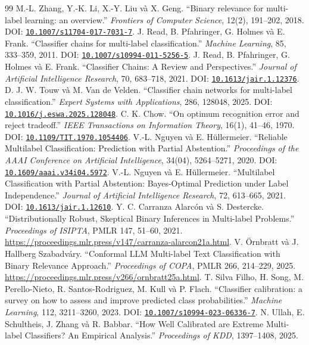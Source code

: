 \documentclass[11pt,a4paper]{article}
\newcommand{\doi}[1]{\href{https://doi.org/#1}{\nolinkurl{#1}}}
\begin{document}
\begin{thebibliography}{99}\small
{} M.-L. Zhang, Y.-K. Li, X.-Y. Liu và X. Geng.
“Binary relevance for multi-label learning: an overview.”
\emph{Frontiers of Computer Science}, 12(2), 191--202, 2018.
DOI: \doi{10.1007/s11704-017-7031-7}.
 J. Read, B. Pfahringer, G. Holmes và E. Frank.
“Classifier chains for multi-label classification.”
\emph{Machine Learning}, 85, 333--359, 2011.
DOI: \doi{10.1007/s10994-011-5256-5}.
 J. Read, B. Pfahringer, G. Holmes và E. Frank.
“Classifier Chains: A Review and Perspectives.”
\emph{Journal of Artificial Intelligence Research}, 70, 683--718, 2021.
DOI: \doi{10.1613/jair.1.12376}.
 D. J. W. Touw và M. Van de Velden.
“Classifier chain networks for multi-label classification.”
\emph{Expert Systems with Applications}, 286, 128048, 2025.
DOI: \doi{10.1016/j.eswa.2025.128048}.
 C. K. Chow.
“On optimum recognition error and reject tradeoff.”
\emph{IEEE Transactions on Information Theory}, 16(1), 41--46, 1970.
DOI: \doi{10.1109/TIT.1970.1054406}.
 V.-L. Nguyen và E. Hüllermeier.
“Reliable Multilabel Classification: Prediction with Partial Abstention.”
\emph{Proceedings of the AAAI Conference on Artificial Intelligence}, 34(04), 5264--5271, 2020.
DOI: \doi{10.1609/aaai.v34i04.5972}.
 V.-L. Nguyen và E. Hüllermeier.
“Multilabel Classification with Partial Abstention: Bayes-Optimal Prediction under Label Independence.”
\emph{Journal of Artificial Intelligence Research}, 72, 613--665, 2021.
DOI: \doi{10.1613/jair.1.12610}.
 Y. C. Carranza Alarcón và S. Destercke.
“Distributionally Robust, Skeptical Binary Inferences in Multi-label Problems.”
\emph{Proceedings of ISIPTA}, PMLR 147, 51--60, 2021.
\url{https://proceedings.mlr.press/v147/carranza-alarcon21a.html}.
 V. Örnbratt và J. Hallberg Szabadváry.
“Conformal LLM Multi-label Text Classification with Binary Relevance Approach.”
\emph{Proceedings of COPA}, PMLR 266, 214--229, 2025.
\url{https://proceedings.mlr.press/v266/ornbratt25a.html}.
 T. Silva Filho, H. Song, M. Perello-Nieto, R. Santos-Rodriguez, M. Kull và P. Flach.
“Classifier calibration: a survey on how to assess and improve predicted class probabilities.”
\emph{Machine Learning}, 112, 3211--3260, 2023.
DOI: \doi{10.1007/s10994-023-06336-7}.
 N. Ullah, E. Schultheis, J. Zhang và R. Babbar.
“How Well Calibrated are Extreme Multi-label Classifiers? An Empirical Analysis.”
\emph{Proceedings of KDD}, 1397--1408, 2025.

\end{thebibliography}
\end{document}
